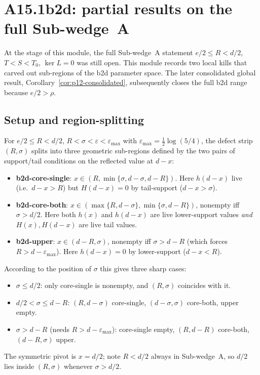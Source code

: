 \section{A15.1b2d: partial results on the full Sub-wedge~A}
\label{sec:p12-b2d}

At the stage of this module, the full Sub-wedge~A statement
$e/2 \le R < d/2$, $T < S < T_{0}$, $\ker L = 0$ was still open.
This module records two local kills that carved out sub-regions of the
b2d parameter space.  The later consolidated global result,
Corollary~\ref{cor:p12-consolidated}, subsequently closes the full b2d
range because $e/2>\rho$.

\subsection{Setup and region-splitting}

For $e/2 \le R < d/2$, $R < \sigma < \varepsilon < \varepsilon_{\max}$
with $\varepsilon_{\max} = \tfrac12 \log(5/4)$, the defect strip
$(R, \sigma)$ splits into three geometric sub-regions defined by the
two pairs of support/tail conditions on the reflected value at $d - x$:
\begin{itemize}
\item \textbf{b2d-core-single}: $x \in (R, \min\{\sigma, d - \sigma,
  d - R\})$.  Here $h(d - x)$ live (i.e.\ $d - x > R$) but
  $H(d - x) = 0$ by tail-support ($d - x > \sigma$).
\item \textbf{b2d-core-both}: $x \in (\max\{R, d - \sigma\},
  \min\{\sigma, d - R\})$, nonempty iff $\sigma > d/2$.  Here
  both $h(x)$ and $h(d - x)$ are live lower-support values \emph{and}
  $H(x), H(d - x)$ are live tail values.
\item \textbf{b2d-upper}: $x \in (d - R, \sigma)$, nonempty iff
  $\sigma > d - R$ (which forces $R > d - \varepsilon_{\max}$).
  Here $h(d - x) = 0$ by lower-support ($d - x < R$).
\end{itemize}

According to the position of $\sigma$ this gives three sharp cases:
\begin{itemize}
\item[(A)] $\sigma \le d/2$: only core-single is nonempty, and
  $(R, \sigma)$ coincides with it.
\item[(B)] $d/2 < \sigma \le d - R$:
  $(R, d - \sigma)$ core-single, $(d - \sigma, \sigma)$ core-both,
  upper empty.
\item[(C)] $\sigma > d - R$ (needs $R > d - \varepsilon_{\max}$):
  core-single empty, $(R, d - R)$ core-both, $(d - R, \sigma)$ upper.
\end{itemize}
The symmetric pivot is $x = d/2$; note $R < d/2$ always in Sub-wedge~A,
so $d/2$ lies inside $(R, \sigma)$ whenever $\sigma > d/2$.

